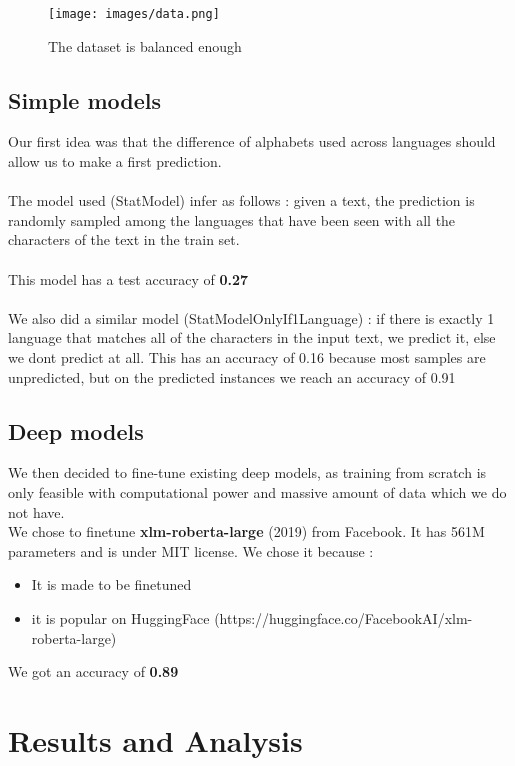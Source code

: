 \documentclass[11pt]{article}
\begin{document}
\begin{figure}[h]
    \centering
    \texttt{[image: images/data.png]}  %
    \caption{The dataset is balanced enough}
    \label{fig:data}
\end{figure}

\subsection{Simple models}
Our first idea was that the difference of alphabets used across languages should allow us to make a first prediction.
\\
\\
The model used (StatModel) infer as follows :
given a text, the prediction is randomly sampled among the languages that have been seen with all the characters of the text in the train set.
\\\\
This model has a test accuracy of \textbf{0.27}
\\\\
We also did a similar model (StatModelOnlyIf1Language) : if there is exactly 1 language that matches all of the characters in the input text, we predict it, else we dont predict at all. This has an accuracy of 0.16 because most samples are unpredicted, but on the predicted instances we reach an accuracy of 0.91

\subsection{Deep models}
We then decided to fine-tune existing deep models, as training from scratch is only feasible with computational power and massive amount of data which we do not have.
\\
We chose to finetune \textbf{xlm-roberta-large} (2019) from Facebook. It has 561M parameters and is under MIT license. We chose it because :
\begin{itemize}[noitemsep, topsep=0pt]
    \item It is made to be finetuned
    \item it is popular on HuggingFace (https://huggingface.co/FacebookAI/xlm-roberta-large)
\end{itemize}

We got an accuracy of \textbf{0.89}

\section{Results and Analysis}




\end{document}
